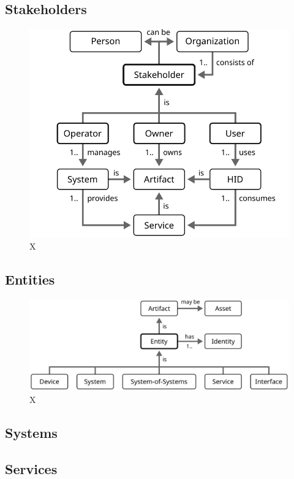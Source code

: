 \subsection{Stakeholders}

\begin{figure}[ht]
  \centering
  \includegraphics{figures/stakeholder-hierarchy}
  \caption{
    X
  }
  \label{fig:stakeholder-hierarchy}
\end{figure}

\subsection{Entities}

\begin{figure}[ht]
  \centering
  \includegraphics{figures/entity-hierarchy}
  \caption{
    X
  }
  \label{fig:entity-hierarchy}
\end{figure}

\subsection{Systems}

\subsection{Services}
